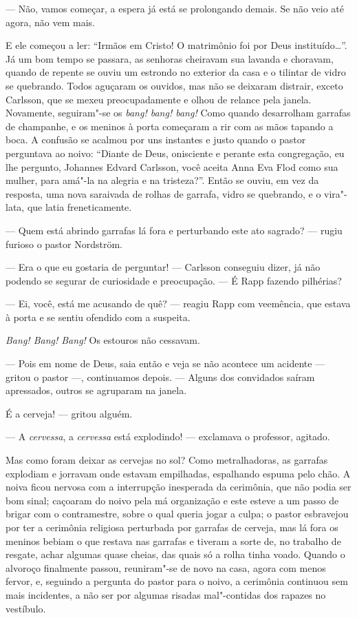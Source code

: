 --- Não, vamos começar, a espera já está se prolongando demais. Se não
veio até agora, não vem mais.

E ele começou a ler: ``Irmãos em Cristo! O matrimônio foi por Deus
instituído\ldots{}''. Já um bom tempo se passara, as senhoras cheiravam sua
lavanda e choravam, quando de repente se ouviu um estrondo no exterior da casa e
o tilintar de vidro se quebrando. Todos aguçaram os ouvidos, mas não se deixaram 
distrair, exceto Carlsson, que se mexeu preocupadamente e olhou de relance
pela janela. Novamente, seguiram"-se os \textit{bang! bang! bang!} Como quando
desarrolham garrafas de champanhe, e os meninos à porta começaram a rir com as
mãos tapando a boca. A confusão se acalmou por uns instantes e justo quando o
pastor perguntava ao noivo: ``Diante de Deus, onisciente e perante esta
congregação, eu lhe pergunto, Johannes Edvard Carlsson, você aceita Anna
Eva Flod como sua mulher, para amá"-la na alegria e na tristeza?''. Então se ouviu,
em vez da resposta, uma nova saraivada de rolhas de garrafa, vidro se quebrando,
e o vira"-lata, que latia freneticamente.

--- Quem está abrindo garrafas lá fora e perturbando este ato sagrado? --- rugiu
furioso o pastor Nordström.

--- Era o que eu gostaria de perguntar! --- Carlsson conseguiu dizer, já não
podendo se segurar de curiosidade e preocupação. --- É Rapp fazendo
pilhérias?

--- Ei, você, está me acusando de quê? --- reagiu Rapp com veemência, que estava à
porta e se sentiu ofendido com a suspeita.

\textit{Bang! Bang! Bang!} Os estouros não cessavam.

--- Pois em nome de Deus, saia então e veja se não acontece um acidente --- gritou
o pastor ---, continuamos depois. --- Alguns dos convidados saíram apressados,
outros se agruparam na janela.

É a cerveja! --- gritou alguém.

--- A \textit{cervessa}, a \textit{cervessa} está explodindo! --- exclamava o professor, agitado.

Mas como foram deixar as cervejas no sol? Como metralhadoras, as garrafas
explodiam e jorravam onde estavam empilhadas, espalhando espuma pelo chão.
A noiva ficou nervosa com a interrupção inesperada da cerimônia, que não podia
ser bom sinal; caçoaram do noivo pela má organização e este esteve a um passo de
brigar com o contramestre, sobre o qual queria jogar a culpa; o pastor esbravejou por
ter a cerimônia religiosa perturbada por garrafas de cerveja, mas lá fora os
meninos bebiam o que restava nas garrafas e tiveram a sorte de, no trabalho de
resgate, achar algumas quase cheias, das quais só a rolha tinha voado. Quando o
alvoroço finalmente passou, reuniram"-se de novo na casa, agora com menos
fervor, e, seguindo a pergunta do pastor para o noivo, a cerimônia continuou sem
mais incidentes, a não ser por algumas risadas mal"-contidas dos rapazes no
vestíbulo.

